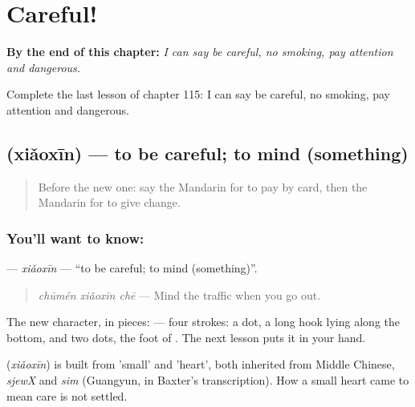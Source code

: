 
\chapter{Careful!}
\label{ch:zh-careful}

\begin{chapteropening}
\textbf{By the end of this chapter:} \emph{I can say be careful, no smoking, pay attention and dangerous.}

Complete the last lesson of chapter 115: I can say be careful, no smoking, pay attention and dangerous.
\end{chapteropening}

\section[\texorpdfstring{\zh{小心} (xiǎoxīn)}{小心 (xiǎoxīn)}]{ (xiǎoxīn) — to be careful; to mind (something)}

\label{lesson:ZH-C115-xiaoxin}



\begin{quote}
Before the new one: say the Mandarin for to pay by card, then the Mandarin for to give change.
\end{quote}

\subsection*{You'll want to know: }
\textbf{} — \emph{xiǎoxīn} — \textquotedblleft{}to be careful; to mind (something)\textquotedblright{}.

\begin{quote}
\textbf{} \emph{chūmén xiǎoxīn chē} — Mind the traffic when you go out.
\end{quote}

The new character, in pieces:  — four strokes: a dot, a long hook lying along the bottom, and two dots, the foot of . The next lesson puts it in your hand.

\begin{cousinweb}
\textbf{} (\emph{xiǎoxīn}) is built from  'small' and  'heart', both inherited from Middle Chinese, \emph{sjewX} and \emph{sim} (Guangyun, in Baxter's transcription). How a small heart came to mean care is not settled.
\end{cousinweb}

